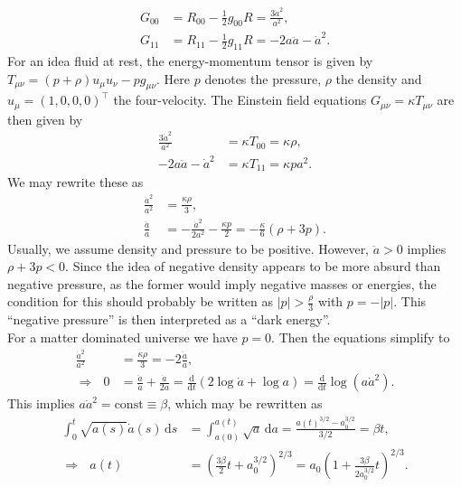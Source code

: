 \documentclass[english, parskip=full]{scrartcl}
\newcommand{\intx}{}
\newcommand{\kla}{}
\newcommand{\tecxt}{}
\begin{document}
\begin{align}
G_{00} &= R_{00} - \frac{1}{2}g_{00} R = \frac{3\dot{a}^2}{a^2},\\
G_{11} &= R_{11} - \frac{1}{2}g_{11} R = -2 a\ddot{a} - \dot{a}^2.
\end{align}
For an idea fluid at rest, the energy-momentum tensor is given by $T_{\mu\nu} = (p+\rho)u_\mu u_\nu - pg_{\mu\nu}$.
Here $p$ denotes the pressure, $\rho$ the density and $u_\mu = (1,0,0,0)^\top$ the four-velocity.
The Einstein field equations $G_{\mu\nu} = \kappa T_{\mu\nu}$ are then given by
\begin{align}
\frac{3\dot{a}^2}{a^2} &= \kappa T_{00} = \kappa \rho,\\
-2a\ddot{a} - \dot{a}^2 &= \kappa T_{11} = \kappa pa^2.
\end{align}
We may rewrite these as
\begin{align}
\frac{\dot{a}^2}{a^2} &= \frac{\kappa\rho}{3},\\
\frac{\ddot{a}}{a} &= -\frac{\dot{a}^2}{2a^2} - \frac{\kappa p}{2} = - \frac{\kappa}{6} \kla\left( \rho + 3p \right).
\end{align}
Usually, we assume density and pressure to be positive.
However, $\ddot{a}>0$ implies $\rho+3p < 0$.
Since the idea of negative density appears to be more absurd than negative pressure, as the former would imply negative masses or energies, the condition for this should probably be written as $|p| > \frac{\rho}{3}$ with $p=-|p|$.
This ``negative pressure'' is then interpreted as a ``dark energy''.
\\
For a matter dominated universe we have $p=0$.
Then the equations simplify to
\begin{align}
\frac{\dot{a}^2}{a^2} &= \frac{\kappa\rho}{3} = -2\frac{\ddot{a}}{a},\\
\Rightarrow\ \ \ 0 &= \frac{\ddot{a}}{\dot{a}} + \frac{\dot{a}}{2a} = \frac{\tecxt\text{d}}{\tecxt\text{d}t} \kla\left( 2\log \dot{a} + \log a \right) = \frac{\tecxt\text{d}}{\tecxt\text{d}t} \log (a\dot{a}^2).
\end{align}
This implies $a\dot{a}^2=\tecxt\text{const} \equiv \beta$, which may be rewritten as
\begin{align}
\intx\int_{ 0}^{ t}\sqrt{a(s)}\dot{a}(s) \, \mathrm{d}s &= \intx\int_{a(0)}^{a(t)} \sqrt{a}\, \mathrm{d}a = \frac{a(t)^{3/2} - a_0^{3/2}}{3/2} = \beta t,\\
\Rightarrow\ \ \ a(t) &= \kla\left( \frac{3\beta}{2} t + a_0^{3/2} \right)^{2/3} = a_0 \kla\left( 1 + \frac{3\beta}{2a_0^{3/2}}t \right)^{2/3}.
\end{align}
\end{document}
